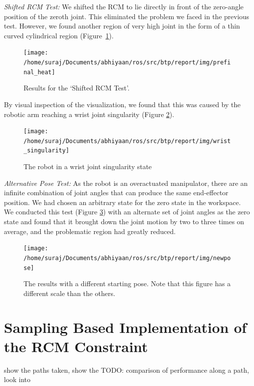 \documentclass[BTech]{iitmdiss}
\begin{document}
    \emph{Shifted RCM Test:} We shifted the RCM to lie directly in front of the zero-angle position of the zeroth joint.
    This eliminated the problem we faced in the previous test.
    However, we found another region of very high joint in the form of a thin curved cylindrical region (Figure~\ref{fig:prefinal_heat}).

    \begin{figure}
        \centering
        \texttt{[image: /home/suraj/Documents/abhiyaan/ros/src/btp/report/img/prefinal\_heat]}
        \caption{Results for the `Shifted RCM Test'.}
        \label{fig:prefinal_heat}
    \end{figure}

    By visual inspection of the visualization, we found that this was caused by the robotic arm reaching a wrist joint singularity (Figure \ref{fig:wrist_singularity}).

    \begin{figure}
        \centering
        \texttt{[image: /home/suraj/Documents/abhiyaan/ros/src/btp/report/img/wrist\_singularity]}
        \caption{The robot in a wrist joint singularity state}
        \label{fig:wrist_singularity}
    \end{figure}

    \emph{Alternative Pose Test:} As the robot is an overactuated manipulator, there are an infinite combination of joint angles that
    can produce the same end-effector position.
    We had chosen an arbitrary state for the zero state in the workspace.
    We conducted this test (Figure \ref{fig:newpose}) with an alternate set of joint angles as the zero state and found
    that it brought down the joint motion by two to three times on average, and the problematic region had greatly reduced.

    \begin{figure}
        \centering
        \texttt{[image: /home/suraj/Documents/abhiyaan/ros/src/btp/report/img/newpose]}
        \caption{The results with a different starting pose. Note that this figure has a different scale than the others.}
        \label{fig:newpose}
    \end{figure}


    \section{Sampling Based Implementation of the RCM Constraint}

    show the paths taken, show the
    TODO: comparison of performance along a path, look into
\end{document}
